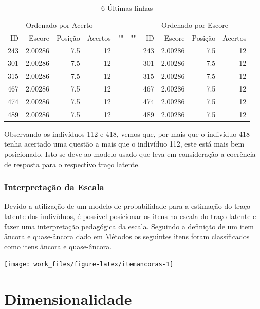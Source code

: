 \documentclass[]{article}
\begin{document}
\begin{table}[!h]

\caption{\label{tab:tab-traço-latente2}6 Últimas linhas}
\centering
\begin{tabular}[t]{rrrrllrrrr}
\toprule
\multicolumn{4}{c}{Ordenado por Acerto} & \multicolumn{1}{c}{ } & \multicolumn{1}{c}{ } & \multicolumn{4}{c}{Ordenado por Escore} \\
\cmidrule(l{2pt}r{2pt}){1-4} \cmidrule(l{2pt}r{2pt}){7-10}
ID & Escore & Posição & Acertos & "" & "" & ID & Escore & Posição & Acertos\\
\midrule
243 & 2.00286 & 7.5 & 12 &  &  & 243 & 2.00286 & 7.5 & 12\\
301 & 2.00286 & 7.5 & 12 &  &  & 301 & 2.00286 & 7.5 & 12\\
315 & 2.00286 & 7.5 & 12 &  &  & 315 & 2.00286 & 7.5 & 12\\
467 & 2.00286 & 7.5 & 12 &  &  & 467 & 2.00286 & 7.5 & 12\\
474 & 2.00286 & 7.5 & 12 &  &  & 474 & 2.00286 & 7.5 & 12\\
489 & 2.00286 & 7.5 & 12 &  &  & 489 & 2.00286 & 7.5 & 12\\
\bottomrule
\end{tabular}
\end{table}

Observando os indivíduos 112 e 418, vemos que, por mais que o indivíduo
418 tenha acertado uma questão a mais que o indivíduo 112, este está
mais bem posicionado. Isto se deve ao modelo usado que leva em
consideração a coerência de resposta para o respectivo traço latente.

\subsubsection{Interpretação da Escala}\label{interpretacao-da-escala}

Devido a utilização de um modelo de probabilidade para a estimação do
traço latente dos indivíduos, é possível posicionar os itens na escala
do traço latente e fazer uma interpretação pedagógica da escala.
Seguindo a definição de um item âncora e quase-âncora dado em
\protect\hyperlink{metodos}{Métodos} os seguintes itens foram
classificados como itens âncora e quase-âncora.

\begin{center}\texttt{[image: work\_files/figure-latex/itemancoras-1]} \end{center}

\section{Dimensionalidade}\label{dimensionalidade}
\end{document}
